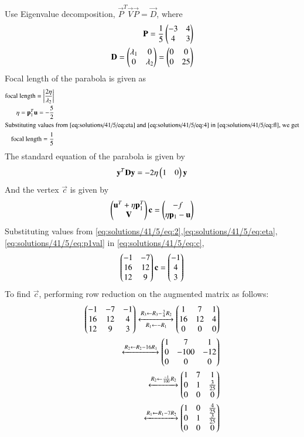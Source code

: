Use Eigenvalue decomposition, $\vec{P}^T\vec{V}\vec{P}=\vec{D}$, where
\begin{align}
    \mathbf{P} = \frac{1}{5}\begin{pmatrix}-3 & 4\\4 & 3\end{pmatrix}\\
    \mathbf{D} = \begin{pmatrix}\lambda_1 & 0\\0 & \lambda_2\end{pmatrix} = \begin{pmatrix}0 & 0\\ 0 & 25\end{pmatrix}
\end{align}
Focal length of the parabola is given as
\begin{align}
    \text{focal length} = \left\vert\frac{2\eta}{\lambda_2}\right\vert\label{eq:solutions/41/5/eq:fl}\\
    \eta = \mathbf{p}_1^T\mathbf{u} = -\frac{5}{2}\label{eq:solutions/41/5/eq:eta}\\
    \intertext{Substituting values from \eqref{eq:solutions/41/5/eq:eta} and \eqref{eq:solutions/41/5/eq:4} in \eqref{eq:solutions/41/5/eq:fl}, we get}
    \text{focal length} = \frac{1}{5}
\end{align}
The standard equation of the parabola is given by
\begin{align}
    \mathbf{y}^T\mathbf{D}\mathbf{y} = -2\eta\begin{pmatrix}1 & 0\end{pmatrix}\mathbf{y}
\end{align}
And the vertex $\vec{c}$ is given by
\begin{align}
    \begin{pmatrix}\mathbf{u}^T + \eta\mathbf{p}_1^T \\ \mathbf{V}\end{pmatrix}\mathbf{c} = \begin{pmatrix}-f \\ \eta\mathbf{p}_1 - \mathbf{u}\end{pmatrix} \label{eq:solutions/41/5/eq:c}
\end{align}
Substituting values from \eqref{eq:solutions/41/5/eq:2},\eqref{eq:solutions/41/5/eq:eta},\eqref{eq:solutions/41/5/eq:p1val} in \eqref{eq:solutions/41/5/eq:c},
\begin{align}
    \begin{pmatrix}-1 & -7\\16 & 12\\12 & 9\end{pmatrix}\mathbf{c} = \begin{pmatrix}-1\\4\\3\end{pmatrix}
\end{align}
To find $\vec{c}$, performing row reduction on the augmented matrix as follows:
\begin{align}
    \begin{pmatrix}-1 & -7 & -1\\16 & 12 & 4\\12 & 9 & 3\end{pmatrix}\xleftrightarrow[R_1\leftarrow -R_1]{R_3\leftarrow R_3-\frac{3}{4}R_2}\begin{pmatrix}1 & 7 & 1\\16 & 12 & 4\\0&0&0\end{pmatrix}\\
    \xleftrightarrow{R_2\leftarrow R_2-16R_1}\begin{pmatrix}1 & 7 & 1\\0 & -100 & -12\\0&0&0\end{pmatrix}\\\xleftrightarrow{R_2\leftarrow \frac{-1}{100}R_2}\begin{pmatrix}1 & 7 & 1\\0 & 1 & \frac{3}{25}\\0&0&0\end{pmatrix}\\\xleftrightarrow{R_1\leftarrow R_1-7R_2}\begin{pmatrix}1 & 0 & \frac{4}{25}\\0 & 1 & \frac{3}{25}\\0&0&0\end{pmatrix}
\end{align}
